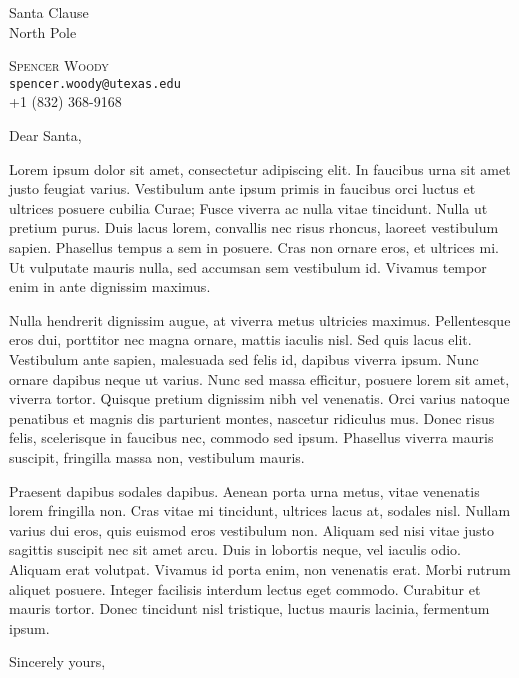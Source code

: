 \documentclass[12pt]{letter}
\date{\today}
\begin{document}

\begin{letter}{Santa Clause \\
North Pole 
}


\begin{center}
\large \textsc{Spencer Woody} \\ 
\small \texttt{spencer.woody@utexas.edu} \\ +1 (832) 368-9168 
\end{center} 

\bigskip

\signature{Spencer Woody \\ Statistics PhD Candidate \\ The University
  of Texas at Austin}


\opening{Dear Santa,} 

Lorem ipsum dolor sit amet, consectetur adipiscing elit. In faucibus
urna sit amet justo feugiat varius. Vestibulum ante ipsum primis in
faucibus orci luctus et ultrices posuere cubilia Curae; Fusce viverra
ac nulla vitae tincidunt. Nulla ut pretium purus. Duis lacus lorem,
convallis nec risus rhoncus, laoreet vestibulum sapien. Phasellus
tempus a sem in posuere. Cras non ornare eros, et ultrices mi. Ut
vulputate mauris nulla, sed accumsan sem vestibulum id. Vivamus tempor
enim in ante dignissim maximus.

Nulla hendrerit dignissim augue, at viverra metus ultricies
maximus. Pellentesque eros dui, porttitor nec magna ornare, mattis
iaculis nisl. Sed quis lacus elit. Vestibulum ante sapien, malesuada
sed felis id, dapibus viverra ipsum. Nunc ornare dapibus neque ut
varius. Nunc sed massa efficitur, posuere lorem sit amet, viverra
tortor. Quisque pretium dignissim nibh vel venenatis. Orci varius
natoque penatibus et magnis dis parturient montes, nascetur ridiculus
mus. Donec risus felis, scelerisque in faucibus nec, commodo sed
ipsum. Phasellus viverra mauris suscipit, fringilla massa non,
vestibulum mauris.

Praesent dapibus sodales dapibus. Aenean porta urna metus, vitae
venenatis lorem fringilla non. Cras vitae mi tincidunt, ultrices lacus
at, sodales nisl. Nullam varius dui eros, quis euismod eros vestibulum
non. Aliquam sed nisi vitae justo sagittis suscipit nec sit amet
arcu. Duis in lobortis neque, vel iaculis odio. Aliquam erat
volutpat. Vivamus id porta enim, non venenatis erat. Morbi rutrum
aliquet posuere. Integer facilisis interdum lectus eget
commodo. Curabitur et mauris tortor. Donec tincidunt nisl tristique,
luctus mauris lacinia, fermentum ipsum.

\closing{Sincerely yours,}


\end{letter}
\end{document}
